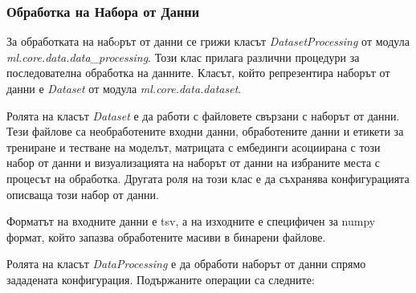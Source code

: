 \documentclass{article}
\newcounter{subsubsubsection}[subsubsection]
\begin{document}
\begin{itemize}
\begin{itemize}
\begin{itemize}
            \end{itemize}

        \end{itemize}

    \end{itemize}

    \subsubsection{Обработка на Набора от Данни}

    За обработката на набoрът от данни се грижи класът \textit{DatasetProcessing} от модула
    \textit{ml.core.data.data\_processing}. Този клас прилага различни процедури за последователна обработка на данните.
    Класът, който репрезентира наборът от данни е \textit{Dataset} от модула \textit{ml.core.data.dataset}.


    Ролята на класът \textit{Dataset} е да работи с файловете свързани с наборът от данни. Тези файлове са необработените
    входни данни, обработените данни и етикети за трениране и тестване на моделът, матрицата с ембединги асоциирана с този
    набор от данни и визуализацията на наборът от данни на избраните места с процесът на обработка. Другата роля на този
    клас е да съхранява конфигурацията описваща този набор от данни.

    Форматът на входните данни е tsv, а на изходните е специфичен за numpy формат, който запазва обработените масиви в
    бинарени файлове.


    Ролята на класът \textit{DataProcessing} е да обработи наборът от данни спрямо зададената конфигурация. Подържаните
    операции са следните:
\end{document}
